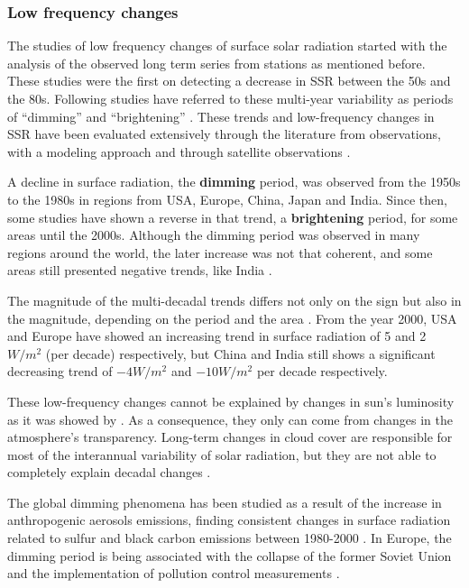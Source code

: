 \subsubsection{Low frequency changes}

The studies of low frequency changes of surface solar radiation started with the analysis of the observed long term series from stations as mentioned before. These studies were the first on detecting a decrease in SSR between the 50s and the 80s. Following studies have referred to these multi-year variability as periods of ``dimming'' and ``brightening'' \cite*{Wild2012}. These trends and low-frequency changes in SSR have been evaluated extensively through the literature from observations, with a modeling approach and through satellite observations \cite*{Wilcox2013, Wild2005, Wild2009, Sanchez-Lorenzo2009, Mateos2014, Pfeifroth2017}.

A decline in surface radiation, the \textbf{dimming} period, was observed from the 1950s to the 1980s in regions from USA, Europe, China, Japan and India. Since then, some studies have shown a reverse in that trend, a \textbf{brightening} period, for some areas until the 2000s. Although the dimming period was observed in many regions around the world, the later increase was not that coherent, and some areas still presented negative trends, like India \cite*{Wild2012}.

The magnitude of the multi-decadal trends differs not only on the sign but also in the magnitude, depending on the period and the area \cite*{Wild2009, Wild2012}. From the year 2000, USA and Europe have showed an increasing trend in surface radiation of 5 and 2 $W/m^2$ (per decade) respectively, but China and India still shows a significant decreasing trend of $-4 W/m^2$ and $-10 W/m^2$ per decade respectively. 

These low-frequency changes cannot be explained by changes in sun's luminosity as it was showed by \cite*{Willson2003}. As a consequence, they only can come from changes in the atmosphere's transparency. Long-term changes in cloud cover are responsible for most of the interannual variability of solar radiation, but they are not able to completely explain decadal changes \cite*{Norris2007, Sanchez-Lorenzo2009}.

The global dimming phenomena has been studied as a result of the increase in anthropogenic aerosols emissions, finding consistent changes in surface radiation related to sulfur and black carbon emissions between 1980-2000 \cite*{Streets2006, Norris2007}. In Europe, the dimming period is being associated with the collapse of the former Soviet Union and the implementation of pollution control measurements \cite*{Wild2005, Wild2009}. %

